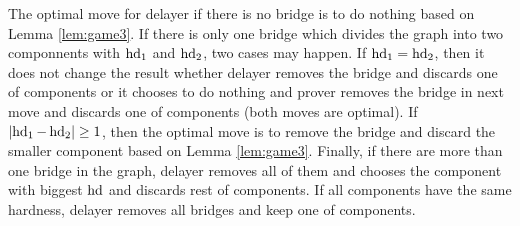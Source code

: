 \documentclass[]{book}
\begin{document}
\begin{lem}\label{lem:game7}
      The optimal move for delayer if there is no bridge is to do nothing based on Lemma \ref{lem:game3}. If there is only one bridge 
	  which divides the graph into two componnents with $\operatorname{hd}_1$ and $\operatorname{hd}_2$, two cases may happen. If $\operatorname{hd}_1= \operatorname{hd}_2$, 
	  then it does not change the result whether delayer removes the bridge  and discards one of components or it chooses to do nothing and 
	  prover removes the bridge in next move and discards one of components (both moves are optimal). If $ \lvert \operatorname{hd}_1- \operatorname{hd}_2  \rvert \geq 1$, 
	  then the optimal move is to remove the bridge and discard the smaller component based on Lemma \ref{lem:game3}. Finally, if there are 
	  more than one bridge in the graph, delayer removes all of them and chooses the component with biggest $\operatorname{hd}$ and discards rest of 
	  components. If all components have the same hardness, delayer removes all bridges and keep one of components.
	  
\end{lem}
\end{document}
